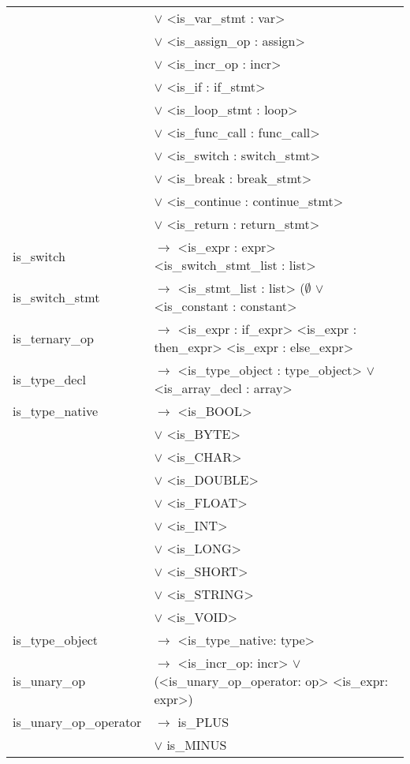 \documentclass[a4paper]{article}
\begin{document}
\begin{tabular}{ll}
											& $\vee$ <is\_var\_stmt : var> \\
											& $\vee$ <is\_assign\_op : assign> \\
											& $\vee$ <is\_incr\_op : incr> \\
											& $\vee$ <is\_if : if\_stmt> \\
											& $\vee$ <is\_loop\_stmt : loop> \\
											& $\vee$ <is\_func\_call : func\_call> \\
											& $\vee$ <is\_switch : switch\_stmt> \\
											& $\vee$ <is\_break : break\_stmt> \\
											& $\vee$ <is\_continue : continue\_stmt> \\
											& $\vee$ <is\_return : return\_stmt> \\
	is\_switch								& $\to$ <is\_expr : expr> <is\_switch\_stmt\_list : list> \\
	is\_switch\_stmt						& $\to$ <is\_stmt\_list : list> ($\emptyset$ $\vee$ <is\_constant : constant> \\
	is\_ternary\_op							& $\to$ <is\_expr : if\_expr> <is\_expr : then\_expr> <is\_expr : else\_expr> \\
	is\_type\_decl							& $\to$ <is\_type\_object : type\_object> $\vee$ <is\_array\_decl : array> \\
	is\_type\_native						& $\to$ <is\_BOOL> \\
											& $\vee$ <is\_BYTE> \\
											& $\vee$ <is\_CHAR> \\
											& $\vee$ <is\_DOUBLE> \\
											& $\vee$ <is\_FLOAT> \\
											& $\vee$ <is\_INT> \\
											& $\vee$ <is\_LONG> \\
											& $\vee$ <is\_SHORT> \\
											& $\vee$ <is\_STRING> \\
											& $\vee$ <is\_VOID> \\
	is\_type\_object		 				& $\to$ <is\_type\_native: type> \\
	is\_unary\_op			 				& $\to$ <is\_incr\_op: incr> $\vee$ (<is\_unary\_op\_operator: op> <is\_expr: expr>) \\
	is\_unary\_op\_operator					& $\to$ is\_PLUS \\
											& $\vee$ is\_MINUS \\

\end{tabular}
\end{document}
